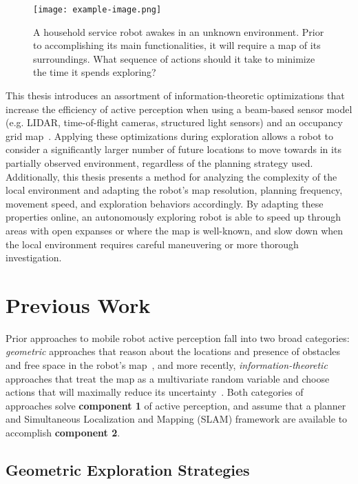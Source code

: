 \begin{figure}[t]
  \centering
  \texttt{[image: example-image.png]}
  \caption{A household service robot awakes in an unknown environment. Prior to
  accomplishing its main functionalities, it will require a map of its surroundings.
What sequence of actions should it take to minimize the time it spends
exploring? \label{fig:motivation}}
\end{figure}

This thesis introduces an assortment of information-theoretic optimizations that
increase the efficiency of active perception when using a beam-based sensor
model (e.g. LIDAR, time-of-flight cameras, structured light sensors) and
an occupancy grid map~\cite{elfes1989using}. Applying these optimizations during exploration allows a
robot to consider a significantly larger number of future locations to move
towards in its partially observed environment, regardless of the planning
strategy used. Additionally, this thesis presents a method for analyzing the
complexity of the local environment and adapting the robot's map resolution,
planning frequency, movement speed, and exploration behaviors accordingly. By
adapting these properties online, an autonomously exploring robot is able to speed up
through areas with open expanses or where the map is well-known, and slow down
when the local environment requires careful maneuvering or more thorough
investigation.

\section{Previous Work}

Prior approaches to mobile robot active perception fall into two
broad categories: \textit{geometric} approaches that reason about the locations and
presence of obstacles and free space in the robot's
map~\cite{acar2002sensor,chan1993line,wang2007view,
burgard2000collaborative,taylor1993exploration,yamauchi1997frontier}, and more
recently, \textit{information-theoretic} approaches that treat the map as
a multivariate random variable and choose actions that will maximally reduce its
uncertainty~\cite{amigoni2010information,bourgault2002information,charrow2015icra,
julian2013mutual,feder1999adaptive}. Both categories of approaches solve {\bf
component 1} of active perception, and assume that a planner and Simultaneous
Localization and Mapping (SLAM) framework are available to accomplish {\bf
component 2}.

\subsection{Geometric Exploration Strategies}

